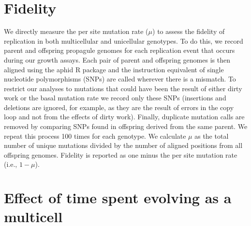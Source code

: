\documentclass[
]{book}
\begin{document}
\hypertarget{fidelity}{%
\chapter{Fidelity}\label{fidelity}}

We directly measure the per site mutation rate (\(\mu\)) to assess the fidelity of replication in both multicellular and unicellular genotypes. To do this, we record parent and offspring propagule genomes for each replication event that occurs during our growth assays. Each pair of parent and offspring genomes is then aligned using the aphid R package \citep{aphid} and the instruction equivalent of single nucleotide polymorphisms (SNPs) are called wherever there is a mismatch. To restrict our analyses to mutations that could have been the result of either dirty work or the basal mutation rate we record only these SNPs (insertions and deletions are ignored, for example, as they are the result of errors in the copy loop and not from the effects of dirty work). Finally, duplicate mutation calls are removed by comparing SNPs found in offspring derived from the same parent. We repeat this process 100 times for each genotype. We calculate \(\mu\) as the total number of unique mutations divided by the number of aligned positions from all offspring genomes. Fidelity is reported as one minus the per site mutation rate (i.e., \(1 - \mu\)).

\hypertarget{effect-of-time-spent-evolving-as-a-multicell}{%
\chapter{Effect of time spent evolving as a multicell}\label{effect-of-time-spent-evolving-as-a-multicell}}
\end{document}
